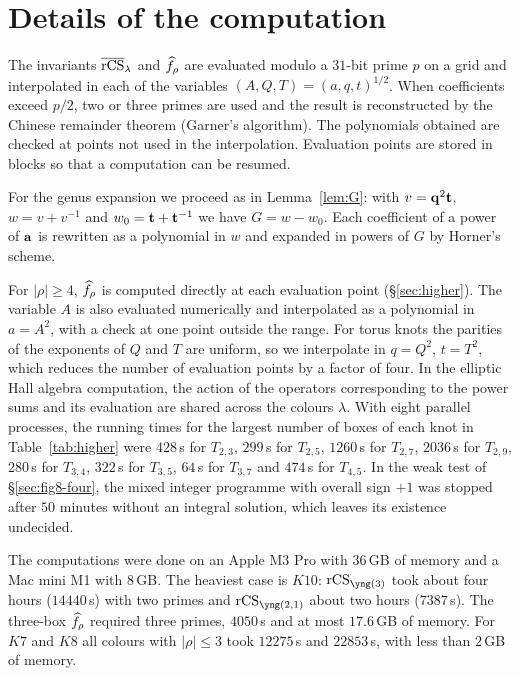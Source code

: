 \section{Details of the computation}\label{app:computation}
The invariants $\overline{\mathrm{rCS}}_\lambda$ and $\widehat{f}_\rho$ are evaluated modulo a $31$-bit prime $p$ on a grid and interpolated in each of the variables $(A,Q,T)=(a,q,t)^{1/2}$.
When coefficients exceed $p/2$, two or three primes are used and the result is reconstructed by the Chinese remainder theorem (Garner's algorithm).
The polynomials obtained are checked at points not used in the interpolation.
Evaluation points are stored in blocks so that a computation can be resumed.

For the genus expansion we proceed as in Lemma~\ref{lem:G}: with $v=\mathbf{q}^2\mathbf{t}$, $w=v+v^{-1}$ and $w_0=\mathbf{t}+\mathbf{t}^{-1}$ we have $G=w-w_0$.
Each coefficient of a power of $\mathbf{a}$ is rewritten as a polynomial in $w$ and expanded in powers of $G$ by Horner's scheme.

For $|\rho|\ge4$, $\widehat{f}_\rho$ is computed directly at each evaluation point (\S\ref{sec:higher}).
The variable $A$ is also evaluated numerically and interpolated as a polynomial in $a=A^2$, with a check at one point outside the range.
For torus knots the parities of the exponents of $Q$ and $T$ are uniform, so we interpolate in $q=Q^2$, $t=T^2$, which reduces the number of evaluation points by a factor of four.
In the elliptic Hall algebra computation, the action of the operators corresponding to the power sums and its evaluation are shared across the colours $\lambda$.
With eight parallel processes, the running times for the largest number of boxes of each knot in Table~\ref{tab:higher} were
$428$\,s for $T_{2,3}$, $299$\,s for $T_{2,5}$, $1260$\,s for $T_{2,7}$, $2036$\,s for $T_{2,9}$,
$280$\,s for $T_{3,4}$, $322$\,s for $T_{3,5}$, $64$\,s for $T_{3,7}$ and $474$\,s for $T_{4,5}$.
In the weak test of \S\ref{sec:fig8-four}, the mixed integer programme with overall sign $+1$ was stopped after $50$ minutes without an integral solution, which leaves its existence undecided.

The computations were done on an Apple M3 Pro with $36$\,GB of memory and a Mac mini M1 with $8$\,GB.
The heaviest case is $K10$: $\rCS_{\yng(3)}$ took about four hours ($14440$\,s) with two primes and $\rCS_{\yng(2,1)}$ about two hours ($7387$\,s).
The three-box $\widehat{f}_\rho$ required three primes, $4050$\,s and at most $17.6$\,GB of memory.
For $K7$ and $K8$ all colours with $|\rho|\le3$ took $12275$\,s and $22853$\,s, with less than $2$\,GB of memory.

